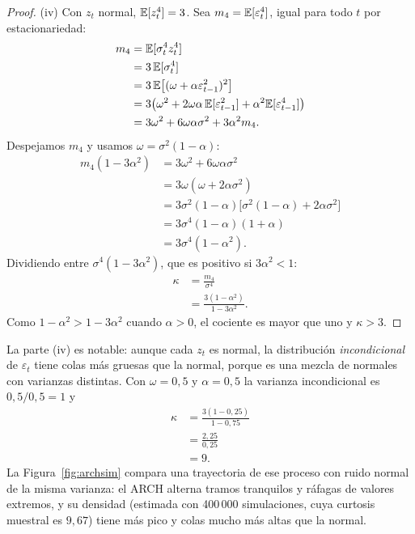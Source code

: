 \begin{proof}
(iv) Con $z_t$ normal, $\mathbb{E}[z_t^4]=3$. Sea $m_4=\mathbb{E}[\varepsilon_t^4]$, igual para todo $t$ por estacionariedad:
\begin{align*}
  m_4 &= \mathbb{E}[\sigma_t^4z_t^4]\\
      &= 3\,\mathbb{E}[\sigma_t^4]\\
      &= 3\,\mathbb{E}\bigl[(\omega+\alpha\varepsilon_{t-1}^2)^2\bigr]\\
      &= 3\bigl(\omega^2+2\omega\alpha\,\mathbb{E}[\varepsilon_{t-1}^2]+\alpha^2\mathbb{E}[\varepsilon_{t-1}^4]\bigr)\\
      &= 3\omega^2+6\omega\alpha\sigma^2+3\alpha^2m_4 .
\end{align*}
Despejamos $m_4$ y usamos $\omega=\sigma^2(1-\alpha)$:
\begin{align*}
  m_4(1-3\alpha^2) &= 3\omega^2+6\omega\alpha\sigma^2\\
                   &= 3\omega(\omega+2\alpha\sigma^2)\\
                   &= 3\sigma^2(1-\alpha)\bigl[\sigma^2(1-\alpha)+2\alpha\sigma^2\bigr]\\
                   &= 3\sigma^4(1-\alpha)(1+\alpha)\\
                   &= 3\sigma^4(1-\alpha^2).
\end{align*}
Dividiendo entre $\sigma^4(1-3\alpha^2)$, que es positivo si $3\alpha^2<1$:
\begin{align*}
  \kappa &= \frac{m_4}{\sigma^4}\\
         &= \frac{3(1-\alpha^2)}{1-3\alpha^2}.
\end{align*}
Como $1-\alpha^2>1-3\alpha^2$ cuando $\alpha>0$, el cociente es mayor que uno y $\kappa>3$.
\end{proof}

La parte (iv) es notable: aunque cada $z_t$ es normal, la distribución \emph{incondicional} de $\varepsilon_t$
tiene colas más gruesas que la normal, porque es una mezcla de normales con varianzas distintas. Con
$\omega=0{,}5$ y $\alpha=0{,}5$ la varianza incondicional es $0{,}5/0{,}5=1$ y
\begin{align*}
  \kappa &= \frac{3(1-0{,}25)}{1-0{,}75}\\
         &= \frac{2{,}25}{0{,}25}\\
         &= 9 .
\end{align*}
La Figura~\ref{fig:archsim} compara una trayectoria de ese proceso con ruido normal de la misma varianza: el
ARCH alterna tramos tranquilos y ráfagas de valores extremos, y su densidad (estimada con 400\,000
simulaciones, cuya curtosis muestral es $9{,}67$) tiene más pico y colas mucho más altas que la normal.


